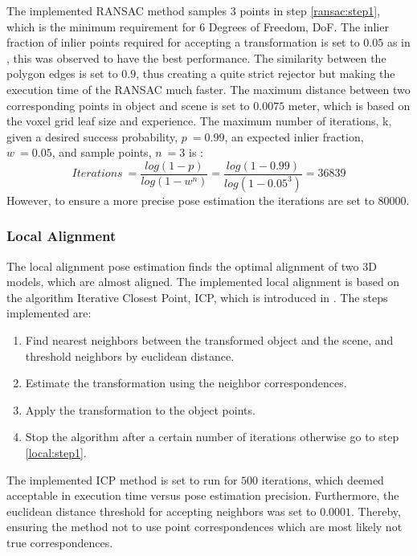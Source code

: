 \documentclass[../main.tex]{subfiles}
\begin{document}
The implemented RANSAC method samples 3 points in step \ref{ransac:step1}, which is the minimum requirement for 6 Degrees of Freedom, DoF. The inlier fraction of inlier points required for accepting a transformation is set to $0.05$ as in \cite{buch2013pose}, this was observed to have the best performance. The similarity between the polygon edges is set to $0.9$, thus creating a quite strict rejector but making the execution time of the RANSAC much faster. The maximum distance between two corresponding points in object and scene is set to $0.0075$ meter, which is based on the voxel grid leaf size and experience. The maximum number of iterations, k, given a desired success probability, $p\ =0.99$, an expected inlier fraction, $w\ =0.05$, and sample points, $n\ =3$ is \cite{RANSAC}:
\begin{equation}
    Iterations\ = \frac{log(1-p)}{log(1-w^n)} = \frac{log(1-0.99)}{log(1-0.05^3)} = 36839
\end{equation}
However, to ensure a more precise pose estimation the iterations are set to 80000.

\subsubsection{Local Alignment} \label{subsubsec:local_alignment}
The local alignment pose estimation finds the optimal alignment of two 3D models, which are almost aligned. The implemented local alignment is based on the algorithm Iterative Closest Point, ICP, which is introduced in \cite{alignment}. The steps implemented are:
\begin{enumerate}
    \item \label{local:step1} Find nearest neighbors between the transformed object and the scene, and threshold neighbors by euclidean distance.
    \item Estimate the transformation using the neighbor correspondences.
    \item Apply the transformation to the object points.
    \item Stop the algorithm after a certain number of iterations otherwise go to step \ref{local:step1}.
\end{enumerate}
The implemented ICP method is set to run for $500$ iterations, which deemed acceptable in execution time versus pose estimation precision. Furthermore, the euclidean distance threshold for accepting neighbors was set to $0.0001$. Thereby, ensuring the method not to use point correspondences which are most likely not true correspondences.
\end{document}
